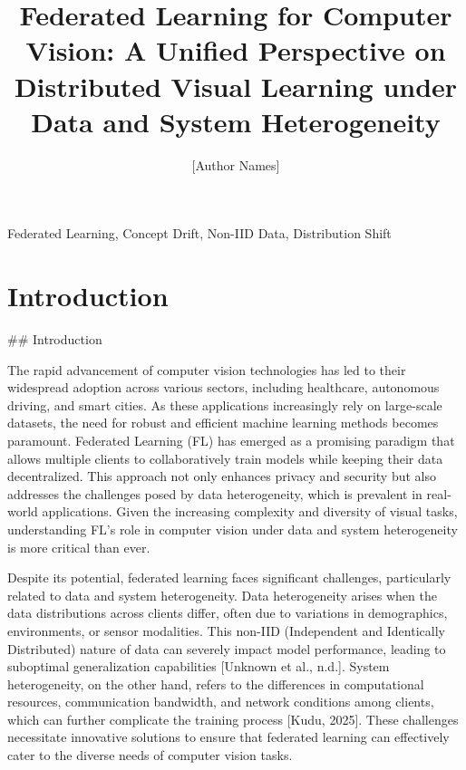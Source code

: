 \documentclass[journal]{IEEEtran}
\title{Federated Learning for Computer Vision: A Unified Perspective on Distributed Visual Learning under Data and System Heterogeneity}
\author{[Author Names]}
\begin{document}
\maketitle

\begin{abstract}
\end{abstract}

\begin{IEEEkeywords}Federated Learning, Concept Drift, Non-IID Data, Distribution Shift\end{IEEEkeywords}

\section{Introduction}
\label{sec:introduction}

\#\# Introduction

The rapid advancement of computer vision technologies has led to their widespread adoption across various sectors, including healthcare, autonomous driving, and smart cities. As these applications increasingly rely on large-scale datasets, the need for robust and efficient machine learning methods becomes paramount. Federated Learning (FL) has emerged as a promising paradigm that allows multiple clients to collaboratively train models while keeping their data decentralized. This approach not only enhances privacy and security but also addresses the challenges posed by data heterogeneity, which is prevalent in real-world applications. Given the increasing complexity and diversity of visual tasks, understanding FL's role in computer vision under data and system heterogeneity is more critical than ever.

Despite its potential, federated learning faces significant challenges, particularly related to data and system heterogeneity. Data heterogeneity arises when the data distributions across clients differ, often due to variations in demographics, environments, or sensor modalities. This non-IID (Independent and Identically Distributed) nature of data can severely impact model performance, leading to suboptimal generalization capabilities [Unknown et al., n.d.]. System heterogeneity, on the other hand, refers to the differences in computational resources, communication bandwidth, and network conditions among clients, which can further complicate the training process [Kudu, 2025]. These challenges necessitate innovative solutions to ensure that federated learning can effectively cater to the diverse needs of computer vision tasks.
\end{document}
